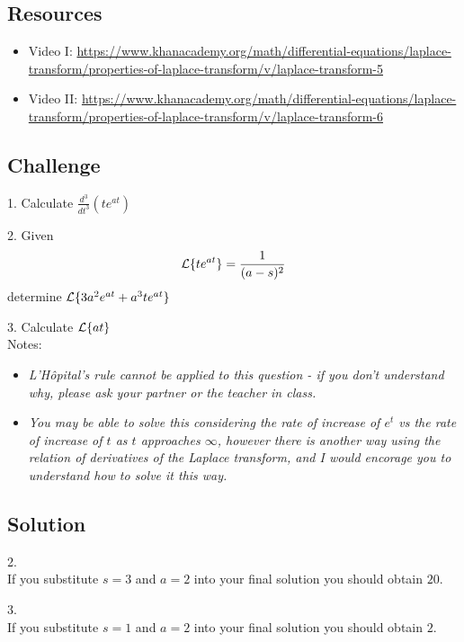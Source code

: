 \subsection*{Resources}
\begin{itemize} %
    \item Video I: \url{https://www.khanacademy.org/math/differential-equations/laplace-transform/properties-of-laplace-transform/v/laplace-transform-5} %
    \item Video II: \url{https://www.khanacademy.org/math/differential-equations/laplace-transform/properties-of-laplace-transform/v/laplace-transform-6} %
\end{itemize}

\subsection*{Challenge}
1. Calculate $\displaystyle \frac{d^3}{dt^3} \left( t e^{a t} \right)$

2. Given
\begin{equation}
    \mathcal{L}\{t e^{a t}\} = \frac{1}{(a-s)^2}
\end{equation}
determine $\mathcal{L}\{3a^2 e^{at} + a^3te^{at}\}$

3. Calculate $\mathcal{L}\{at\}$\\
Notes:
\begin{itemize}
    \item \emph{L'H\^opital's rule cannot be applied to this question - if you don't understand why, please ask your partner or the teacher in class.}
    \item \emph{You may be able to solve this considering the rate of increase of $e^t$ vs the rate of increase of $t$ as $t$ approaches $\infty$, however there is another way using the relation of derivatives of the Laplace transform, and I would encorage you to understand how to solve it this way.}
\end{itemize}

\subsection*{Solution}
2.\\
If you substitute $s=3$ and $a=2$ into your final solution you should obtain $20$.

3.\\
If you substitute $s=1$ and $a=2$ into your final solution you should obtain $2$.






